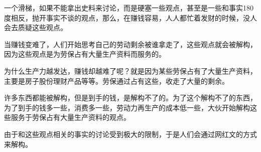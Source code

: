 \begin{zhihuanswer}
一个滑梯，如果不能拿出史料来讨论，而是硬塞一些观点，甚至是一些和事实180度相反，抛开事实不谈的观点，那么，在赚钱容易，人人都忙着发财的时候，没人会去质疑这些观点。

当赚钱变难了，人们开始思考自己的劳动剩余被谁拿走了，这些观点就会被解构，因为这些观点是为劳保占有大量生产资料而服务的。

为什么生产力越发达，赚钱却越难了呢？就是因为某些劳保占有了大量生产资料，主要是房子股份理财产品等等。劳保通过占有这些，收走了大量的剩余。

许多东西都能被解构，但是到手的钱，是解构不了的。为了这个解构不了的东西，为了到手的钱多一些，消费多一些，劳动力再生产的成本低一些，大伙开始解构这些服务于劳保占有大量生产资料的观点。

由于和这些观点相关的事实的讨论受到极大的限制，于是人们会通过网红文的方式来解构。
\end{zhihuanswer}
